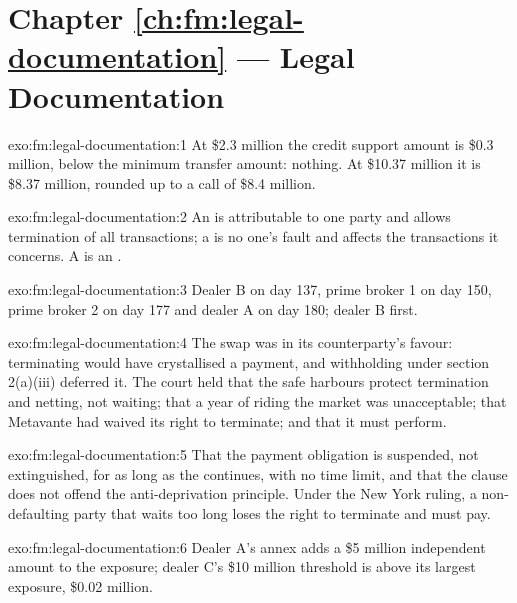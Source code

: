 \section*{Chapter \ref{ch:fm:legal-documentation} --- Legal Documentation}

\begin{solution}{exo:fm:legal-documentation:1}
At \$2.3 million the credit support amount is \$0.3 million, below the minimum transfer amount: nothing. At \$10.37 million it is \$8.37 million,
rounded up to a call of \$8.4 million.
\end{solution}

\begin{solution}{exo:fm:legal-documentation:2}
An  is attributable to one party and allows termination of all transactions; a  is no one's fault and affects the
transactions it concerns. A  is an .
\end{solution}

\begin{solution}{exo:fm:legal-documentation:3}
Dealer B on day 137, prime broker 1 on day 150, prime broker 2 on day 177 and dealer A on day 180; dealer B first.
\end{solution}

\begin{solution}{exo:fm:legal-documentation:4}
The swap was in its counterparty's favour: terminating would have crystallised a payment, and withholding under section 2(a)(iii) deferred it.
The court held that the safe harbours protect termination and netting, not waiting; that a year of riding the market was unacceptable; that
Metavante had waived its right to terminate; and that it must perform.
\end{solution}

\begin{solution}{exo:fm:legal-documentation:5}
That the payment obligation is suspended, not extinguished, for as long as the  continues, with no time limit, and that the clause
does not offend the anti-deprivation principle. Under the New York ruling, a non-defaulting party that waits too long loses the right to terminate
and must pay.
\end{solution}

\begin{solution}{exo:fm:legal-documentation:6}
Dealer A's annex adds a \$5 million independent amount to the exposure; dealer C's \$10 million threshold is above its largest exposure, \$0.02
million.
\end{solution}

